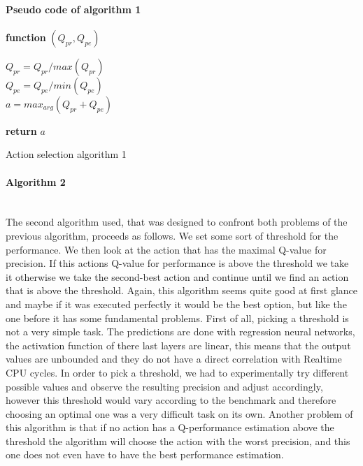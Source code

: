 \paragraph{Pseudo code of algorithm 1}
\begin{center}
\begin{algorithm}[H]

    \textbf{function}  $(Q_{pr},Q_{pe})$\;
    
    
    \Indp{}\Indm
    \Indp{} \Indm
    \Indp
    $Q_{pr} = Q_{pr}/max(Q_{pr})$\\
    $Q_{pe} = Q_{pe}/min(Q_{pe})$\\
    $a = max_{arg}(Q_{pr}+Q_{pe})$
    
  
   \textbf{return} $a$

\caption{Action selection algorithm 1}
\end{algorithm}
\end{center}
\paragraph{Algorithm 2}\mbox{}\\
The second algorithm used, that was designed to confront both problems of the previous algorithm, proceeds as follows. We set some sort of threshold for the performance. We then look at the action that has the maximal Q-value for precision. If this actions Q-value for performance is above the threshold we take it otherwise we take the second-best action and continue until we find an action that is above the threshold. Again, this algorithm seems quite good at first glance and maybe if it was executed perfectly it would be the best option, but like the one before it has some fundamental problems. First of all, picking a threshold is not a very simple task. The predictions are done with regression neural networks, the activation function of there last layers are linear, this means that the output values are unbounded and they do not have a direct correlation with Realtime CPU cycles. In order to pick a threshold, we had to experimentally try different possible values and observe the resulting precision and adjust accordingly, however this threshold would vary according to the benchmark and therefore choosing an optimal one was a very difficult task on its own. Another problem of this algorithm is that if no action has a Q-performance estimation above the threshold the algorithm will choose the action with the worst precision, and this one does not even have to have the best performance estimation. 
